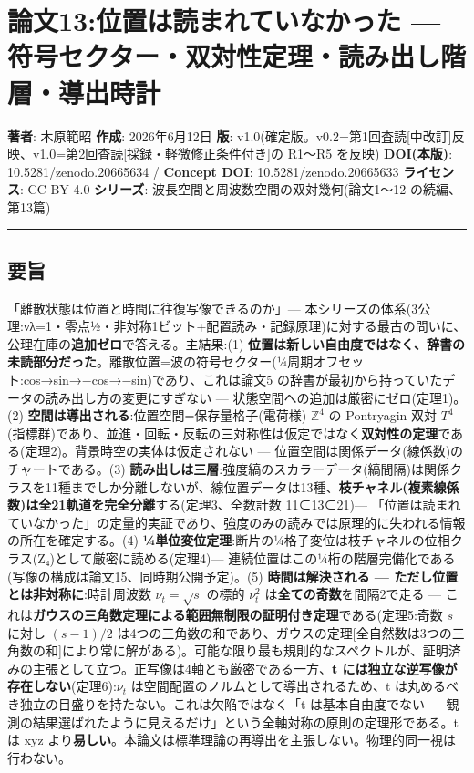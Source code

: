 \documentclass[
]{ltjsarticle}
\author{}
\date{}
\begin{document}
\section{論文13:位置は読まれていなかった ---
符号セクター・双対性定理・読み出し階層・導出時計}\label{ux8ad6ux658713ux4f4dux7f6eux306fux8aadux307eux308cux3066ux3044ux306aux304bux3063ux305f-ux7b26ux53f7ux30bbux30afux30bfux30fcux53ccux5bfeux6027ux5b9aux7406ux8aadux307fux51faux3057ux968eux5c64ux5c0eux51faux6642ux8a08}

\textbf{著者}: 木原範昭 \textbf{作成}: 2026年6月12日 \textbf{版}:
v1.0(確定版。v0.2=第1回査読{[}中改訂{]}反映、v1.0=第2回査読{[}採録・軽微修正条件付き{]}の
R1〜R5 を反映) \textbf{DOI(本版)}: 10.5281/zenodo.20665634 /
\textbf{Concept DOI}: 10.5281/zenodo.20665633 \textbf{ライセンス}: CC BY
4.0 \textbf{シリーズ}: 波長空間と周波数空間の双対幾何(論文1〜12
の続編、第13篇)

\begin{center}\rule{0.5\linewidth}{0.5pt}\end{center}

\subsection{要旨}\label{ux8981ux65e8}

「離散状態は位置と時間に往復写像できるのか」---
本シリーズの体系(3公理:νλ=1・零点½・非対称1ビット+配置読み・記録原理)に対する最古の問いに、公理在庫の\textbf{追加ゼロ}で答える。主結果:(1)
\textbf{位置は新しい自由度ではなく、辞書の未読部分だった}。離散位置=波の符号セクター(¼周期オフセット:cos→sin→−cos→−sin)であり、これは論文5
の辞書が最初から持っていたデータの読み出し方の変更にすぎない ---
状態空間への追加は厳密にゼロ(定理1)。(2)
\textbf{空間は導出される}:位置空間=保存量格子(電荷様) \(\mathbb{Z}^4\)
の Pontryagin 双対
\(T^4\)(指標群)であり、並進・回転・反転の三対称性は仮定ではなく\textbf{双対性の定理}である(定理2)。背景時空の実体は仮定されない
--- 位置空間は関係データ(線係数)のチャートである。(3)
\textbf{読み出しは三層}:強度縞のスカラーデータ(縞間隔)は関係クラスを11種までしか分離しないが、線位置データは13種、\textbf{枝チャネル(複素線係数)は全21軌道を完全分離}する(定理3、全数計数
11⊂13⊂21)---
「位置は読まれていなかった」の定量的実証であり、強度のみの読みでは原理的に失われる情報の所在を確定する。(4)
\textbf{¼単位変位定理}:断片の¼格子変位は枝チャネルの位相クラス(Z₄)として厳密に読める(定理4)---
連続位置はこの¼桁の階層完備化である(写像の構成は論文15、同時期公開予定)。(5)
\textbf{時間は解決される --- ただし位置とは非対称に}:時計周波数
\(\nu_t=\sqrt{s}\) の標的 \(\nu_t^2\) は\textbf{全ての奇数}を間隔2で走る
---
これは\textbf{ガウスの三角数定理による範囲無制限の証明付き定理}である(定理5:奇数
\(s\) に対し \((s-1)/2\)
は4つの三角数の和であり、ガウスの定理{[}全自然数は3つの三角数の和{]}により常に解がある)。可能な限り最も規則的なスペクトルが、証明済みの主張として立つ。正写像は4軸とも厳密である一方、\textbf{t
には独立な逆写像が存在しない}(定理6):\(\nu_t\)
は空間配置のノルムとして導出されるため、t
は丸めるべき独立の目盛りを持たない。これは欠陥ではなく「t
は基本自由度でない ---
観測の結果選ばれたように見えるだけ」という全軸対称の原則の定理形である。t
は xyz
より\textbf{易しい}。本論文は標準理論の再導出を主張しない。物理的同一視は行わない。
\end{document}
